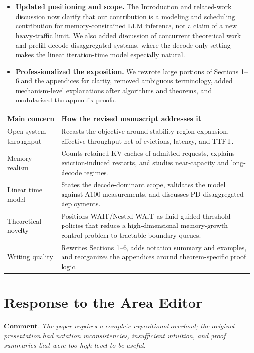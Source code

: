 \documentclass[11pt]{article}
\newcommand{\comment}[1]{%
  \vspace{0.25em}
  \noindent\textbf{Comment.} \emph{#1}
}
\begin{document}
\begin{itemize}
    \item \textbf{Updated positioning and scope.} The Introduction and related-work discussion now clarify that our contribution is a modeling and scheduling contribution for memory-constrained LLM inference, not a claim of a new heavy-traffic limit. We also added discussion of concurrent theoretical work and prefill-decode disaggregated systems, where the decode-only setting makes the linear iteration-time model especially natural.
    \item \textbf{Professionalized the exposition.} We rewrote large portions of Sections 1--6 and the appendices for clarity, removed ambiguous terminology, added mechanism-level explanations after algorithms and theorems, and modularized the appendix proofs.
\end{itemize}

\begin{center}
\begin{tabularx}{0.96\textwidth}{@{}p{}X@{}}
\toprule
\textbf{Main concern} & \textbf{How the revised manuscript addresses it} \\
\midrule
Open-system throughput & Recasts the objective around stability-region expansion, effective throughput net of evictions, latency, and TTFT. \\
Memory realism & Counts retained KV caches of admitted requests, explains eviction-induced restarts, and studies near-capacity and long-decode regimes. \\
Linear time model & States the decode-dominant scope, validates the model against A100 measurements, and discusses PD-disaggregated deployments. \\
Theoretical novelty & Positions WAIT/Nested WAIT as fluid-guided threshold policies that reduce a high-dimensional memory-growth control problem to tractable boundary queues. \\
Writing quality & Rewrites Sections 1--6, adds notation summary and examples, and reorganizes the appendices around theorem-specific proof logic. \\
\bottomrule
\end{tabularx}
\end{center}

\section*{Response to the Area Editor}

\comment{The paper requires a complete expositional overhaul; the original presentation had notation inconsistencies, insufficient intuition, and proof summaries that were too high level to be useful.}
\end{document}
